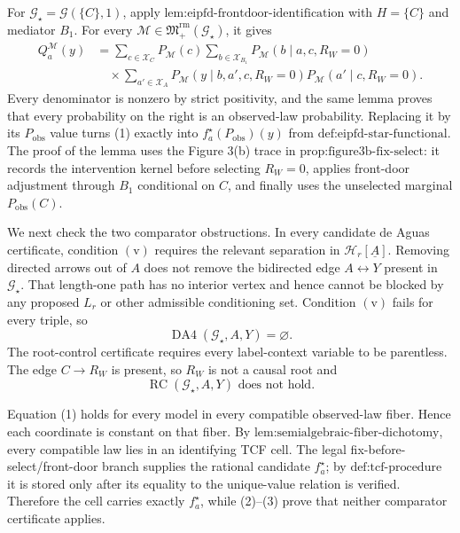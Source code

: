 For \(\mathcal G_\star=\mathcal G(\{C\},1)\), apply \(\text{lem:eipfd-frontdoor-identification}\) with \(H=\{C\}\) and mediator \(B_1\). For every \(\mathcal M\in\mathfrak M_+^{\mathrm{rm}}(\mathcal G_\star)\), it gives
\[
\begin{aligned}
Q_a^{\mathcal M}(y)
&=\sum_{c\in\mathcal X_C}P_{\mathcal M}(c)
\sum_{b\in\mathcal X_{B_1}}P_{\mathcal M}(b\mid a,c,R_W=0)\\
&\quad\times\sum_{a'\in\mathcal X_A}
P_{\mathcal M}(y\mid b,a',c,R_W=0)
P_{\mathcal M}(a'\mid c,R_W=0).
\end{aligned}
\tag{1}
\]
Every denominator is nonzero by strict positivity, and the same lemma proves that every probability on the right is an observed-law probability. Replacing it by its \(P_{\mathrm{obs}}\) value turns (1) exactly into \(f_a^\star(P_{\mathrm{obs}})(y)\) from \(\text{def:eipfd-star-functional}\). The proof of the lemma uses the Figure 3(b) trace in \(\text{prop:figure3b-fix-select}\): it records the intervention kernel before selecting \(R_W=0\), applies front-door adjustment through \(B_1\) conditional on \(C\), and finally uses the unselected marginal \(P_{\mathrm{obs}}(C)\).

We next check the two comparator obstructions. In every candidate de Aguas certificate, condition \(\mathrm{(v)}\) requires the relevant separation in \(\mathcal H_r[\underline A]\). Removing directed arrows out of \(A\) does not remove the bidirected edge \(A\leftrightarrow Y\) present in \(\mathcal G_\star\). That length-one path has no interior vertex and hence cannot be blocked by any proposed \(L_r\) or other admissible conditioning set. Condition \(\mathrm{(v)}\) fails for every triple, so
\[
\operatorname{DA4}(\mathcal G_\star,A,Y)=\varnothing.
\tag{2}
\]
The root-control certificate requires every label-context variable to be parentless. The edge \(C\to R_W\) is present, so \(R_W\) is not a causal root and
\[
\operatorname{RC}(\mathcal G_\star,A,Y)\text{ does not hold}.
\tag{3}
\]

Equation (1) holds for every model in every compatible observed-law fiber. Hence each coordinate is constant on that fiber. By \(\text{lem:semialgebraic-fiber-dichotomy}\), every compatible law lies in an identifying TCF cell. The legal fix-before-select/front-door branch supplies the rational candidate \(f_a^\star\); by \(\text{def:tcf-procedure}\) it is stored only after its equality to the unique-value relation is verified. Therefore the cell carries exactly \(f_a^\star\), while (2)--(3) prove that neither comparator certificate applies.
